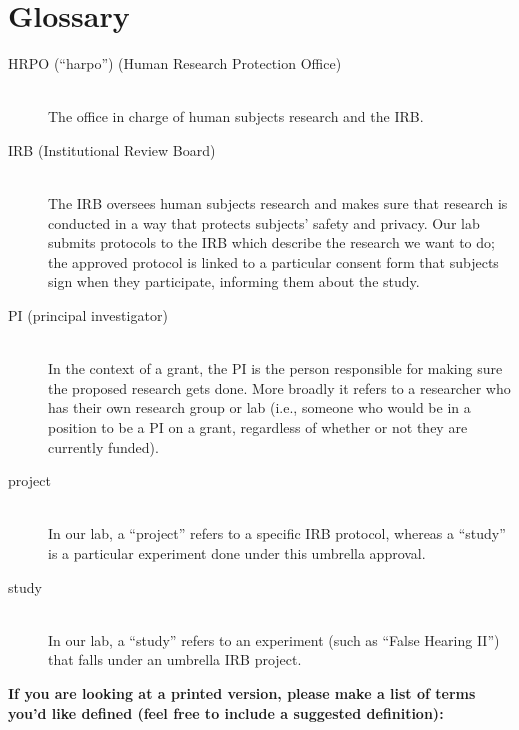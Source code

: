 \documentclass[letterpaper,12pt,oneside]{memoir}
\begin{document}
\chapter{Glossary}

\begin{description}

\item[HRPO (``harpo'') (Human Research Protection Office)] \hfill \\
The office in charge of human subjects research and the IRB.

\item[IRB (Institutional Review Board)] \hfill \\
The IRB oversees human subjects research and makes sure that research is conducted in a way that protects subjects' safety and privacy. Our lab submits protocols to the IRB which describe the research we want to do; the approved protocol is linked to a particular consent form that subjects sign when they participate, informing them about the study.

\item[PI (principal investigator)] \hfill \\
In the context of a grant, the PI is the person responsible for making sure the proposed research gets done. More broadly it refers to a researcher who has their own research group or lab (i.e., someone who would be in a position to be a PI on a grant, regardless of whether or not they are currently funded).

\item[project] \hfill \\
In our lab, a ``project'' refers to a specific IRB protocol, whereas a ``study'' is a particular experiment done under this umbrella approval.

\item[study] \hfill \\
In our lab, a ``study'' refers to an experiment (such as ``False Hearing II'') that falls under an umbrella IRB project.

\end{description}

\vspace{.2in}
\noindent \textbf{\large If you are looking at a printed version, please make a list of terms you'd like defined (feel free to include a suggested definition):}



%
%
\end{document}
